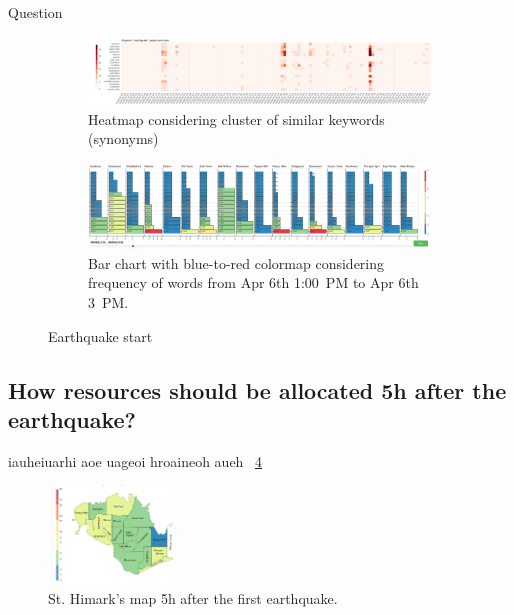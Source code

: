 \begin{section}{Question}
\begin{figure}[!h]
    \centering
    \begin{subfigure}[!h]{0.95\textwidth}
        \centering
        \includegraphics[width=1.00\textwidth]{figs/eq_start_heat.png}
        \caption{Heatmap considering cluster of similar keywords (synonyms)}
        \label{fig:eq_start_heat}
    \vspace{12pt}
    \end{subfigure}
    \begin{subfigure}[!h]{0.95\textwidth}
        \centering
        \includegraphics[width=1.00\textwidth]{figs/eq_start_hbar.png}
        \caption{Bar chart with blue-to-red colormap considering frequency of
        words from Apr 6th 1:00~PM to Apr 6th 3~PM.}
        \label{fig:eq_start_hbar}
    \end{subfigure}
    \caption{Earthquake start}
    \label{fig:eq_start}
\end{figure}

\subsection{How resources should be allocated 5h after the earthquake?}

iauheiuarhi aoe uageoi hroaineoh aueh ~\ref{fig:map_5h}

\begin{figure}[!h]
    \centering
    \includegraphics[width=0.30\textwidth]{figs/cond_5h/cond_5h_svg.png}
    \caption{St. Himark's map 5h after the first earthquake.}
    \label{fig:map_5h}
\end{figure}


\end{section}
